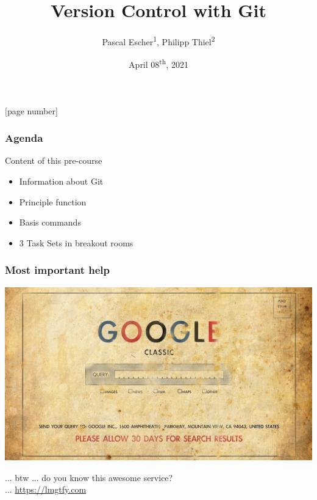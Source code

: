 \documentclass{beamer} %
\begin{document}
\author{Pascal Escher\textsuperscript{1}, Philipp Thiel\textsuperscript{2}}
\title[Git]{Version Control with Git}
\date{April 08\textsuperscript{th}, 2021}
[page number]{}

\maketitle

\begin{frame}
	\frametitle{Agenda}
	Content of this pre-course
	\begin{itemize}
		\setlength\itemsep{1em}
		\item Information about Git
		\item Principle function 
		\item Basis commands
		\item 3 Task Sets in breakout rooms
	\end{itemize}
\end{frame}
 
\begin{frame}
\frametitle{Most important help}
\begin{center}

	\includegraphics[scale=0.18]{assets/google_classic.jpg}

	... btw ...  do you know this awesome service? \\
	... \url{https://lmgtfy.com}

\end{center}
\end{frame}
\end{document}
